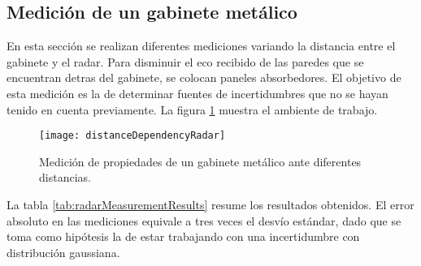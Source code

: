 \subsection{Medición de un gabinete metálico}

En esta sección se realizan diferentes mediciones variando la distancia entre el gabinete y el radar. Para disminuir el eco recibido de las paredes que se encuentran detras del gabinete, se colocan paneles absorbedores. El objetivo de esta medición es la de determinar fuentes de incertidumbres que no se hayan tenido en cuenta previamente. La figura \ref{fig:DistDependencySim2} muestra el ambiente de trabajo.
\begin{figure}[htb]
  \centering
  \texttt{[image: distanceDependencyRadar]}
  \caption{Medición de propiedades de un gabinete metálico ante diferentes distancias.}
  \label{fig:DistDependencySim2}
\end{figure}

La tabla \ref{tab:radarMeasurementResults} resume los resultados obtenidos. El error absoluto en las mediciones equivale a tres veces el desvío estándar, dado que se toma como hipótesis la de estar trabajando con una incertidumbre con distribución gaussiana.

